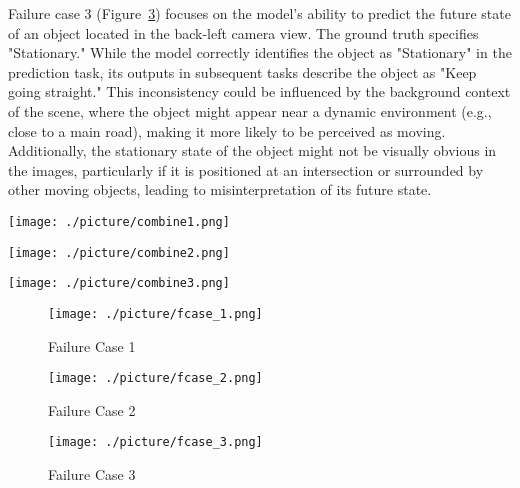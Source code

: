 Failure case 3 (Figure~\ref{fcase_3})  focuses on the model's ability to predict the future state of an object located in the back-left camera view. The ground truth specifies "Stationary." While the model correctly identifies the object as "Stationary" in the prediction task, its outputs in subsequent tasks describe the object as "Keep going straight." This inconsistency could be influenced by the background context of the scene, where the object might appear near a dynamic environment (e.g., close to a main road), making it more likely to be perceived as moving. Additionally, the stationary state of the object might not be visually obvious in the images, particularly if it is positioned at an intersection or surrounded by other moving objects, leading to misinterpretation of its future state.

\begin{figure*}
    \centering
    \texttt{[image: ./picture/combine1.png]}
    \caption{Correct Cases 1-3}
    \label{combine_1}
\end{figure*}


\begin{figure*}
    \centering
    \texttt{[image: ./picture/combine2.png]}
    \caption{Correct Cases 4-6}    
    \label{combine_2}

\end{figure*}


\begin{figure*}
    \centering
    \texttt{[image: ./picture/combine3.png]}
    \caption{Correct Cases 7-8}
    \label{combine_3}
\end{figure*}










\begin{figure}
    \centering
    \texttt{[image: ./picture/fcase\_1.png]}
    \caption{Failure Case 1}
    \label{fcase_1}
\end{figure}
\begin{figure}
    \centering
    \texttt{[image: ./picture/fcase\_2.png]}
    \caption{Failure Case 2}
    \label{fcase_2}
\end{figure}
\begin{figure}
    \centering
    \texttt{[image: ./picture/fcase\_3.png]}
    \caption{Failure Case 3}
    \label{fcase_3}
\end{figure}

